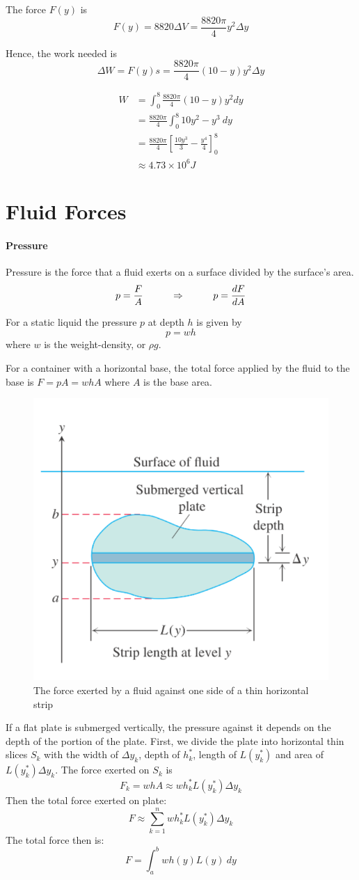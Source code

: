 \documentclass[12pt]{article}
\newcommand\tab[1][1cm]{\hspace*{#1}}
\begin{document}
The force $F(y)$ is 
\[
    F(y) = 8820 \Delta V = \frac{8820 \pi}{4} y^2 \Delta y 
\]

Hence, the work needed is 
\[
    \Delta W = F(y) s = \frac{8820 \pi}{4} (10 - y) y^2 \Delta y 
\]

\begin{align*} 
     W &= \int_0^8 \frac{8820 \pi}{4} (10 - y) y^2 dy \\
    &= \frac{8820 \pi}{4} \int_0^8 10y^2 - y^3\: dy \\
    &= \frac{8820 \pi}{4} \left[ \frac{10y^3}{3} - \frac{y^4}{4} \right]_0^8\,\\
    &\approx 4.73 \times 10^6 J
\end{align*}


\section{Fluid Forces}
\paragraph{Pressure}
Pressure is the force that a fluid exerts on a surface divided by the surface's area.
\[
    p = \frac{F}{A} \textrm{\tab} \Rightarrow \textrm{\tab} p = \frac{dF}{dA}
\]

For a static liquid the pressure $p$ at depth $h$ is given by
\[
    p = wh
\]
where $w$ is the weight-density, or $\rho g$. 

For a container with a horizontal base, the total force applied by the fluid to the base is $F = pA = whA$
where $A$ is the base area.

\begin{figure}[H]
    \centering
    \includegraphics[width = 0.4\linewidth]{Images/fluid force.png}
    \caption{The force exerted by a fluid against one side of a thin horizontal strip}
\end{figure}
If a flat plate is submerged vertically, the pressure against it depends on the depth of the portion of the plate.
First, we divide the plate into horizontal thin slices $S_k$ with the width of $\Delta y_k$, depth of $h_k^*$, length of $L(y_k^*)$ and area 
of $L(y_k^*)\Delta y_k$. The force exerted on $S_k$ is 
\[
    F_k = whA \approx wh_k^* L(y^*_k) \Delta y_k
\]
Then the total force exerted on plate:
\[
    F \approx \sum_{k = 1}^n wh_k^* L(y_k^*) \Delta y_k
\]
The total force then is:
\[
    F = \int_a^b wh(y)L(y)\: dy
\]
\end{document}
